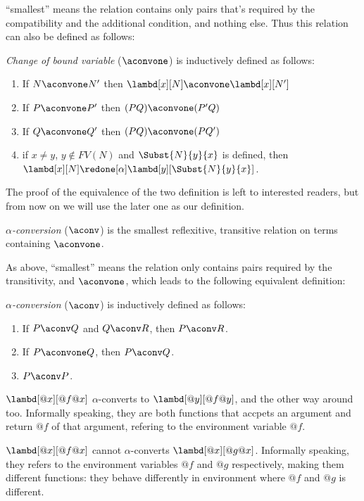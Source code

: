 \documentclass[../../../include/open-logic-section]{subfiles}
\begin{document}
``smallest'' means the relation contains only pairs that's required by
the compatibility and the additional condition, and nothing else. Thus
this relation can also be defined as follows:
\begin{defn} 
  \emph{Change of bound variable} ($\aconvone$) is inductively
  defined as follows:
  \begin{enumerate}
  \item If $N \aconvone N'$ then $\lambd[x][N] \aconvone
    \lambd[x][N']$ 
  \item If $P \aconvone P'$ then $(PQ) \aconvone (P'Q)$ 
  \item If $Q \aconvone Q'$ then $(PQ) \aconvone (PQ')$ 
  \item if $x \neq y$, $y \notin FV(N)$ and $\Subst{N}{y}{x}$ is defined, then
    $\lambd[x][N] \redone[\alpha] \lambd[y][\Subst{N}{y}{x}]$.
    
  \end{enumerate}
\end{defn}

The proof of the equivalence of the two definition is left to
interested readers, but from now on we will use the later one as our
definition.

\begin{defn}
  \emph{$\alpha$-conversion} ($\aconv$) is the smallest reflexitive, transitive relation on terms containing $\aconvone$.
\end{defn}

As above, ``smallest'' means the relation only contains pairs required
by the transitivity, and $\aconvone$, which leads to the following equivalent definition:
\begin{defn}
  \emph{$\alpha$-conversion} ($\aconv$) is inductively defined as follows:
  \begin{enumerate}
  \item If $P \aconv Q$ and $Q \aconv R$, then $P \aconv R$.
  \item If $P \aconvone Q$, then $P \aconv Q$. 
  \item $P \aconv P$. 
  \end{enumerate}
\end{defn}

\begin{ex}
  $\lambd[@x][@f @x]$ $\alpha$-converts to $\lambd[@y][@f
  @y]$, and the other way around too. Informally
  speaking, they are both functions that accpets an argument and
  return $@f$ of that argument, refering to the environment variable $@f$.
\end{ex}
\begin{ex}
  $\lambd[@x][@f @x]$ cannot $\alpha$-converts $\lambd[@x][@g
  @x]$. Informally speaking, they refers to the environment variables $@f$ and $@g$ respectively,
  making them different functions: they behave differently in
  environment where $@f$ and $@g$ is different.
\end{ex}
\end{document}
